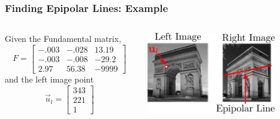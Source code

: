 \begin{frame}
    \frametitle{Finding Epipolar Lines: Example}
    
    \begin{columns}
        \begin{column}{0.45\textwidth} %
            Given the Fundamental matrix,
            \begin{equation*}
                F = \begin{bmatrix}
                    -.003 & -.028 & 13.19 \\
                    -.003 & -.008 & -29.2 \\
                    2.97 & 56.38 & -9999
                \end{bmatrix}
            \end{equation*}
            and the left image point
            \begin{equation*}
                \vec{u}_l =
                \begin{bmatrix}
                    343 \\ 221 \\ 1
                \end{bmatrix}
            \end{equation*}
        \end{column}
        \begin{column}{0.55\textwidth} %
            \centering
            \includegraphics[width=0.8\textwidth]{./images/epipolar_line_example_1.pdf}
        \end{column}
    \end{columns}


\end{frame}
